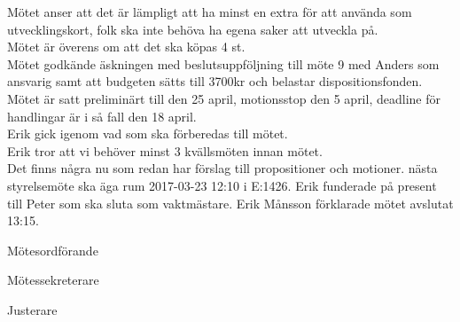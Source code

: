 \documentclass[10pt]{article}
\def\mo{Erik Månsson}
\def\ms{Johan Karlberg}
\def\ji{Pontus Landgren}
\begin{document}
\begin{paragrafer}
Mötet anser att det är lämpligt att ha minst en extra för att använda som utvecklingskort, folk ska inte behöva ha egena saker att utveckla på.\\
Mötet är överens om att det ska köpas 4 st.\\
Mötet godkände äskningen med beslutsuppföljning till möte 9 med Anders som ansvarig samt att budgeten sätts till 3700kr och belastar dispositionsfonden.
Mötet är satt preliminärt till den 25 april, motionsstop den 5 april, deadline för handlingar är i så fall den 18 april.\\
Erik gick igenom vad som ska förberedas till mötet.\\
Erik tror att vi behöver minst 3 kvällsmöten innan mötet.\\
Det finns några nu som redan har förslag till propositioner och motioner.
{\Mba}nästa styrelsemöte ska äga rum 2017-03-23 12:10 i E:1426.
{\Ibfu}
Erik funderade på present till Peter som ska sluta som vaktmästare.
{\mo} förklarade mötet avslutat 13:15.

\end{paragrafer}
\hidesignfoot
\begin{signatures}{3}
\signature{\mo}{Mötesordförande}
\signature{\ms}{Mötessekreterare}
\signature{\ji}{Justerare}
\end{signatures}
\end{document}
